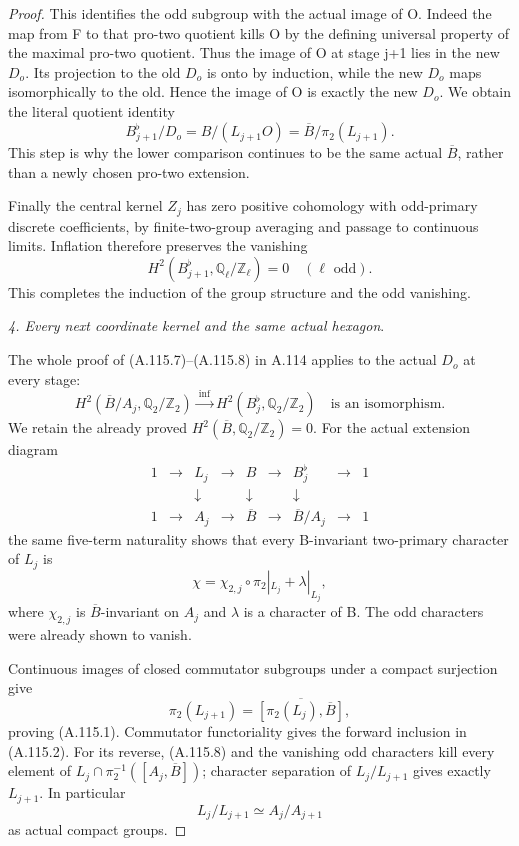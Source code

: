 \begin{proof}
This identifies the odd subgroup with the actual image of O. Indeed the map from F to that pro-two quotient kills O by the defining universal property of the maximal pro-two quotient. Thus the image of O at stage j+1 lies in the new \(D_o\). Its projection to the old \(D_o\) is onto by induction, while the new \(D_o\) maps isomorphically to the old. Hence the image of O is exactly the new \(D_o\). We obtain the literal quotient identity
\[
B_{j+1}^\flat/D_o
 =B/(L_{j+1}O)=\overline B/\pi_2(L_{j+1}).                   \tag{A.115.6}
\]
This step is why the lower comparison continues to be the same actual \(\overline B\), rather than a newly chosen pro-two extension.

Finally the central kernel \(Z_j\) has zero positive cohomology with odd-primary discrete coefficients, by finite-two-group averaging and passage to continuous limits. Inflation therefore preserves the vanishing
\[
H^2(B_{j+1}^\flat,\mathbb Q_\ell/\mathbb Z_\ell)=0
\quad(\ell\text{ odd}).
\]
This completes the induction of the group structure and the odd vanishing.

\medskip\noindent\emph{4. Every next coordinate kernel and the same actual hexagon}.

The whole proof of (A.115.7)--(A.115.8) in A.114 applies to the actual \(D_o\) at every stage:
\[
H^2(\overline B/A_j,\mathbb Q_2/\mathbb Z_2)
 \xrightarrow{\ \mathrm{inf}\ }
H^2(B_j^\flat,\mathbb Q_2/\mathbb Z_2)
\quad\text{is an isomorphism}.                              \tag{A.115.7}
\]
We retain the already proved
\(H^2(\overline B,\mathbb Q_2/\mathbb Z_2)=0\).
For the actual extension diagram
\[
\begin{array}{ccccccccc}
1&\to&L_j&\to&B&\to&B_j^\flat&\to&1\\
 &&\downarrow&&\downarrow&&\downarrow\\
1&\to&A_j&\to&\overline B&\to&\overline B/A_j&\to&1
\end{array}
\]
the same five-term naturality shows that every B-invariant two-primary character of \(L_j\) is
\[
\chi=\chi_{2,j}\circ\pi_2|_{L_j}+\lambda|_{L_j},              \tag{A.115.8}
\]
where \(\chi_{2,j}\) is \(\overline B\)-invariant on \(A_j\) and \(\lambda\) is a character of B. The odd characters were already shown to vanish.

Continuous images of closed commutator subgroups under a compact surjection give
\[
\pi_2(L_{j+1})
 =\overline{[\pi_2(L_j),\overline B]},
\]
proving (A.115.1). Commutator functoriality gives the forward inclusion in (A.115.2). For its reverse, (A.115.8) and the vanishing odd characters kill every element of
\(L_j\cap\pi_2^{-1}([A_j,\overline B])\); character separation of \(L_j/L_{j+1}\) gives exactly \(L_{j+1}\). In particular
\[
L_j/L_{j+1}\simeq A_j/A_{j+1}
\]
as actual compact groups.


\end{proof}

